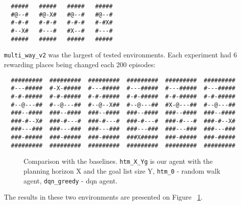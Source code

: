 \documentclass[runningheads]{llncs}
\begin{document}
\begin{verbatim}
  #####   #####   #####   #####
  #@--#   #@-X#   #@--#   #@--#
  #-#-#   #-#-#   #-#-#   #-#X#
  #--X#   #---#   #X--#   #---#
  #####   #####   #####   #####
\end{verbatim}

\texttt{multi\_way\_v2} was the largest of tested environments. Each experiment had 6 rewarding places being changed each 200 episodes:

\begin{verbatim}
  #########  #########  #########  #########  #########  #########
  #---#####  #-X-#####  #---#####  #---#####  #---#####  #---#####
  #-#-#####  #-#-#####  #-#-#####  #-#-#####  #-#-#####  #-#-#####
  #--@---##  #--@---##  #--@--X##  #--@---##  #X-@---##  #--@---##
  ###--####  ###--####  ###--####  ###--####  ###--####  ###--####
  ###-#--X#  ###-#---#  ###-#---#  ###-#---#  ###-#---#  ###-#--X#
  ###---###  ###---###  ###---###  ###---###  ###---###  ###---###
  ###-#####  ###-#####  ###-#####  ###X#####  ###-#####  ###-#####
  #########  #########  #########  #########  #########  #########
\end{verbatim}

\begin{figure}
  \centering
  \begin{minipage}{.49\linewidth}
    
  \end{minipage}
  \begin{minipage}{.49\linewidth}
    
  \end{minipage}
  \caption{Comparison with the baselines. \texttt{htm\_X\_Yg} is our agent with the planning horizon X and the goal list size Y, \texttt{htm\_0} - random walk agent, \texttt{dqn\_greedy} - dqn agent.} \label{fig_comparison_mw}
\end{figure}

The results in these two environments are presented on Figure ~\ref{fig_comparison_mw}.
\end{document}
